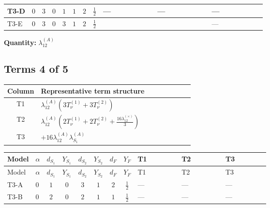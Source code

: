 \documentclass[8pt]{article}
\begin{document}
\begin{landscape}
\begin{longtable}{@{}llcccccc >{\raggedright\arraybackslash}p{0.21\linewidth} >{\raggedright\arraybackslash}p{0.21\linewidth} >{\raggedright\arraybackslash}p{0.21\linewidth}@{}}
\midrule
T3-D & $0$ & $3$ & $0$ & $1$ & $1$ & $2$ & $\frac{1}{2}$ & --- & --- & --- \\
\midrule
T3-E & $0$ & $3$ & $0$ & $3$ & $1$ & $2$ & $\frac{1}{2}$ & \scriptsize\adjustbox{max width=\linewidth}{$\begin{gathered} +2 {\lambda_{12}^{(A)}} {\lambda_{S_1}^{(1)}}\end{gathered}$} & \scriptsize\adjustbox{max width=\linewidth}{$\begin{gathered} +2 {\lambda_{12}^{(A)}} {\lambda_{S_2}^{(1)}}\end{gathered}$} & --- \\
\midrule
\bottomrule
\end{longtable}
\clearpage
\noindent\textbf{Quantity: }$\lambda_{12}^{(A)}$\par\smallskip
\subsection*{Terms 4 of 5}
\begin{center}
\begin{tabular}{@{}c >{\raggedright\arraybackslash}p{0.82\linewidth}@{}}
\toprule
Column & Representative term structure \\
\midrule
T1 & \(\displaystyle {\lambda_{12}^{(A)}} (3 T_{\nu}^{(1)}+3 T_{\nu}^{(2)})\) \\
\midrule
T2 & \(\displaystyle {\lambda_{12}^{(A)}} \left(2 T_{\nu}^{(1)}+2 T_{\nu}^{(2)}+\frac{16 {\lambda_{12}^{(\times)}}}{3}\right)\) \\
\midrule
T3 & \(\displaystyle +16 {\lambda_{12}^{(A)}} {\lambda_{S_1}^{(A)}}\) \\
\midrule
\bottomrule
\end{tabular}
\end{center}
\smallskip
\tiny
\begin{longtable}{@{}llcccccc >{\raggedright\arraybackslash}p{0.21\linewidth} >{\raggedright\arraybackslash}p{0.21\linewidth} >{\raggedright\arraybackslash}p{0.21\linewidth}@{}}
\toprule
Model & $\alpha$ & $d_{S_1}$ & $Y_{S_1}$ & $d_{S_2}$ & $Y_{S_2}$ & $d_F$ & $Y_F$ & T1 & T2 & T3 \\
\midrule
\endfirsthead
\toprule
Model & $\alpha$ & $d_{S_1}$ & $Y_{S_1}$ & $d_{S_2}$ & $Y_{S_2}$ & $d_F$ & $Y_F$ & T1 & T2 & T3 \\
\midrule
\endhead
T3-A & $0$ & $1$ & $0$ & $3$ & $1$ & $2$ & $\frac{1}{2}$ & --- & --- & --- \\
\midrule
T3-B & $0$ & $2$ & $0$ & $2$ & $1$ & $1$ & $\frac{1}{2}$ & --- & --- & --- \\

\end{longtable}
\end{landscape}
\end{document}
